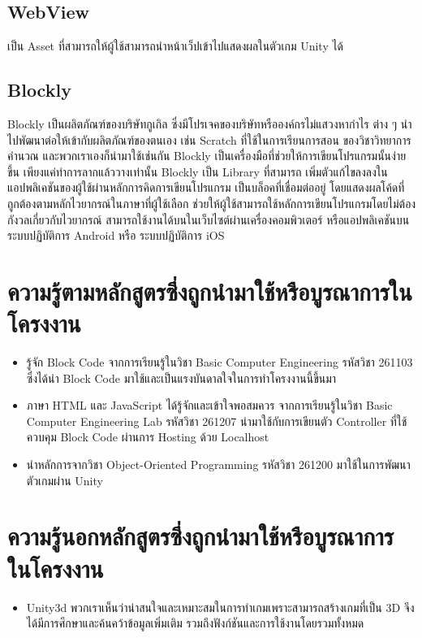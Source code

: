 \subsection{WebView}
เป็น Asset ที่สามารถให้ผู้ใช้สามารถนำหน้าเว็ปเข้าไปแสดงผลในตัวเกม Unity ได้~\cite{unw}
\subsection{Blockly}
Blockly เป็นผลิตภัณฑ์ของบริษัทกูเกิล ซึ่งมีโปรเจคของบริษัทหรือองค์กรไม่แสวงหากำไร 
ต่าง ๆ นำไปพัฒนาต่อให้เข้ากับผลิตภัณฑ์ของตนเอง เช่น Scratch ที่ใช้ในการเรียนการสอน
ของวิชาวิทยาการคำนวณ
และพวกเราเองก็นำมาใช้เช่นกัน Blockly 
เป็นเครื่องมือที่ช่วยให้การเขียนโปรแกรมนั้นง่ายขึ้น 
เพียงแค่ทำการลากแล้ววางเท่านั้น   Blockly เป็น Library ที่สามารถ
เพิ่มตัวแก้ไขลงลงในแอปพลิเคชันของผู้ใช้ผ่านหลักการคิดการเขียนโปรแกรม
เป็นบล็อคที่เชื่อมต่ออยู่ โดยแสดงผลโค้ดที่ถูกต้องตามหลักไวยากรณ์ในภาษาที่ผู้ใช้เลือก 
ช่วยให้ผู้ใช้สามารถใช้หลักการเขียนโปรแกรมโดยไม่ต้องกังวลเกี่ยวกับไวยากรณ์ 
สามารถใช้งานได้บนในเว็บไซต์ผ่านเครื่องคอมพิวเตอร์ หรือแอปพลิเคชันบน 
ระบบปฏิบัติการ Android หรือ ระบบปฏิบัติการ iOS~\cite{blc}


\section{ความรู้ตามหลักสูตรซึ่งถูกนำมาใช้หรือบูรณาการในโครงงาน}
\begin{itemize}
  \item รู้จัก Block Code จากการเรียนรู้ในวิชา Basic Computer Engineering รหัสวิชา 261103 ซึ่งได้นำ Block Code มาใช้และเป็นแรงบันดาลใจในการทำโครงงานนี้ขึ้นมา
  \item ภาษา HTML และ JavaScript ได้รู้จักและเข้าใจพอสมควร จากการเรียนรู้ในวิชา Basic Computer Engineering Lab รหัสวิชา 261207 นำมาใช้กับการเขียนตัว Controller ที่ใช้ควบคุม Block Code ผ่านการ Hosting ด้วย Localhost
  \item นำหลักการจากวิชา Object-Oriented Programming รหัสวิชา 261200 มาใช้ในการพัฒนาตัวเกมผ่าน Unity
\end{itemize}

\section{ความรู้นอกหลักสูตรซึ่งถูกนำมาใช้หรือบูรณาการในโครงงาน}
\begin{itemize}
  \item Unity3d พวกเราเห็นว่าน่าสนใจและเหมาะสมในการทำเกมเพราะสามารถสร้างเกมที่เป็น 3D จึงได้มีการศึกษาและค้นคว้าข้อมูลเพิ่มเติม รวมถึงฟังก์ชันและการใช้งานโดยรวมทั้งหมด
\end{itemize}

